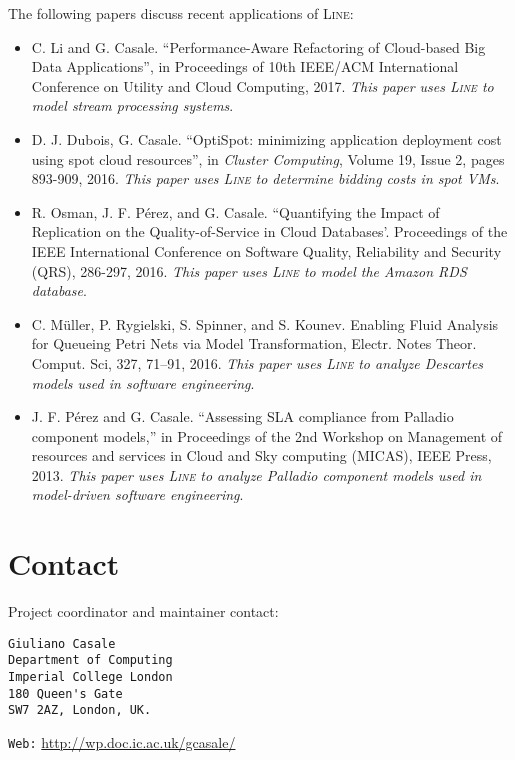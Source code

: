 \noindent The following papers discuss recent applications of \textsc{Line}:
\begin{itemize}
\item \noindent C. Li and G. Casale. ``Performance-Aware Refactoring of Cloud-based Big Data Applications'', in { Proceedings of 10th IEEE/ACM International Conference on Utility and Cloud Computing}, 2017. {\em This paper uses \textsc{Line} to model stream processing systems}.

\item \noindent D. J. Dubois, G. Casale. ``OptiSpot: minimizing application deployment cost using spot cloud resources'', in {\em Cluster Computing}, Volume 19, Issue 2, pages 893-909, 2016. {\em This paper uses \textsc{Line} to determine bidding costs in spot VMs}.

\item \noindent R. Osman, J. F. P\'erez, and G. Casale. ``Quantifying the Impact of Replication on the Quality-of-Service in Cloud Databases'. {Proceedings of the IEEE International Conference on Software Quality, Reliability and Security (QRS)}, 286-297, 2016. {\em This paper uses \textsc{Line} to model the Amazon RDS database}.

\item C. M{\"{u}}ller, P. Rygielski, S. Spinner, and S. Kounev. {Enabling Fluid Analysis for Queueing Petri Nets via Model Transformation}, {Electr. Notes Theor. Comput. Sci}, {327}, {71--91}, {2016}. {\em This paper uses \textsc{Line} to analyze Descartes models used in software engineering}.

\item  \noindent J. F. P\'erez and G. Casale. ``Assessing SLA compliance from Palladio component models,'' in {Proceedings of the 2nd Workshop on Management of resources and services in Cloud and Sky computing (MICAS)}, IEEE Press, 2013. {\em This paper uses \textsc{Line} to analyze Palladio component models used in model-driven software engineering}.
\end{itemize}

\section{Contact}
\noindent Project coordinator and maintainer contact:
\begin{verbatim}
Giuliano Casale
Department of Computing
Imperial College London
180 Queen's Gate
SW7 2AZ, London, UK.
\end{verbatim}
\noindent \texttt{Web:} \url{http://wp.doc.ic.ac.uk/gcasale/}

